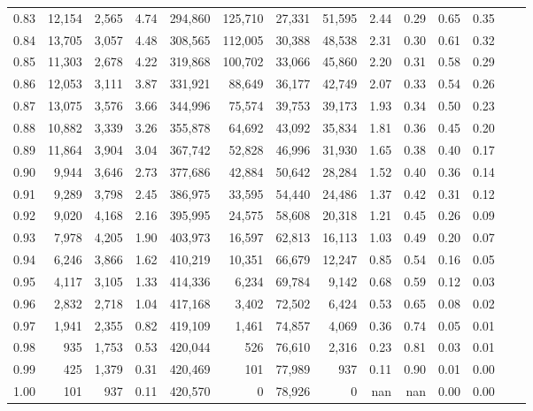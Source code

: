 \begin{tabular}{rrrrrrrrrrrrrr}
0.83 &  12,154 &  2,565 &     4.74 &  294,860 &  125,710 &  27,331 &  51,595 &  2.44 &  0.29 &  0.65 &      0.35 \\
0.84 &  13,705 &  3,057 &     4.48 &  308,565 &  112,005 &  30,388 &  48,538 &  2.31 &  0.30 &  0.61 &      0.32 \\
0.85 &  11,303 &  2,678 &     4.22 &  319,868 &  100,702 &  33,066 &  45,860 &  2.20 &  0.31 &  0.58 &      0.29 \\
0.86 &  12,053 &  3,111 &     3.87 &  331,921 &   88,649 &  36,177 &  42,749 &  2.07 &  0.33 &  0.54 &      0.26 \\
0.87 &  13,075 &  3,576 &     3.66 &  344,996 &   75,574 &  39,753 &  39,173 &  1.93 &  0.34 &  0.50 &      0.23 \\
0.88 &  10,882 &  3,339 &     3.26 &  355,878 &   64,692 &  43,092 &  35,834 &  1.81 &  0.36 &  0.45 &      0.20 \\
0.89 &  11,864 &  3,904 &     3.04 &  367,742 &   52,828 &  46,996 &  31,930 &  1.65 &  0.38 &  0.40 &      0.17 \\
0.90 &   9,944 &  3,646 &     2.73 &  377,686 &   42,884 &  50,642 &  28,284 &  1.52 &  0.40 &  0.36 &      0.14 \\
0.91 &   9,289 &  3,798 &     2.45 &  386,975 &   33,595 &  54,440 &  24,486 &  1.37 &  0.42 &  0.31 &      0.12 \\
0.92 &   9,020 &  4,168 &     2.16 &  395,995 &   24,575 &  58,608 &  20,318 &  1.21 &  0.45 &  0.26 &      0.09 \\
0.93 &   7,978 &  4,205 &     1.90 &  403,973 &   16,597 &  62,813 &  16,113 &  1.03 &  0.49 &  0.20 &      0.07 \\
0.94 &   6,246 &  3,866 &     1.62 &  410,219 &   10,351 &  66,679 &  12,247 &  0.85 &  0.54 &  0.16 &      0.05 \\
0.95 &   4,117 &  3,105 &     1.33 &  414,336 &    6,234 &  69,784 &   9,142 &  0.68 &  0.59 &  0.12 &      0.03 \\
0.96 &   2,832 &  2,718 &     1.04 &  417,168 &    3,402 &  72,502 &   6,424 &  0.53 &  0.65 &  0.08 &      0.02 \\
0.97 &   1,941 &  2,355 &     0.82 &  419,109 &    1,461 &  74,857 &   4,069 &  0.36 &  0.74 &  0.05 &      0.01 \\
0.98 &     935 &  1,753 &     0.53 &  420,044 &      526 &  76,610 &   2,316 &  0.23 &  0.81 &  0.03 &      0.01 \\
0.99 &     425 &  1,379 &     0.31 &  420,469 &      101 &  77,989 &     937 &  0.11 &  0.90 &  0.01 &      0.00 \\
1.00 &     101 &    937 &     0.11 &  420,570 &        0 &  78,926 &       0 &   nan &   nan &  0.00 &      0.00 \\
\bottomrule
\end{tabular}
